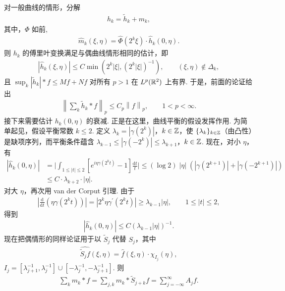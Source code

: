 对一般曲线的情形，分解
\begin{align*}
  h_{k}=\widetilde{h}_{k}+m_{k},
\end{align*}
其中，$\Phi$ 如前,
\begin{align*}
  \widehat{m}_{k}(\xi,\eta)=\widehat{\Phi}(2^{k}\xi)\cdot\widehat{h}_{k}(0,\eta).
\end{align*}
则 $h_{k}$ 的傅里叶变换满足与偶曲线情形相同的估计，即
\begin{align*}
  |\widehat{h}_{k}(\xi,\eta)|\leq C\min(2^{k}|\xi|,(2^{k}|\xi|)^{-1}),\qquad (\xi,\eta)\notin\Delta_{k},
\end{align*}
且 $\sup_k |\widetilde{h}_k| * f \leq M f + N f$ 对所有 $p > 1$ 在 $L^p(\mathbb{R}^2)$ 上有界. 于是，前面的论证给出
\begin{align*}
  \left\|\sum_{k}\widetilde{h}_{k}*f\right\|_{p}\leq C_{p}\left\|f\right\|_{p},\qquad 1<p<\infty.
\end{align*}
接下来需要估计 $h_k(0, \eta)$ 的衰减. 正是在这里，曲线平衡的假设发挥作用. 为简单起见，假设平衡常数 $k \leq 2$. 定义 $\lambda_k = |\gamma(2^k)|$，$k \in \mathbb{Z}$，使 $\{\lambda_k\}_{k \in \mathbb{Z}}$（由凸性）是缺项序列，而平衡条件蕴含 $\lambda_{k-1} \leq |\gamma(-2^k)| \leq \lambda_{k+1}$，$k \in \mathbb{Z}$. 现在，对小 $\eta$，有
\begin{align*}
  |\widehat{h}_{k}(0,\eta)|
  &=\Big|\int_{1\leq|t|\leq 2}[e^{i\eta\gamma(2^{k} t)}-1]\frac{\mathrm{d}t}{t}\Big|
  \leq(\log 2)\;|\eta|\;(\left|\gamma(2^{k+1})\right|+\left|\gamma(-2^{k+1})\right|)\\
  &\leq C\cdot\lambda_{k+2}\cdot|\eta|.
\end{align*}
对大 $\eta$，再次用 van der Corput 引理. 由于
\begin{align*}
  \left|\frac{\mathrm{d}}{\mathrm{d}t}(\eta\gamma(2^{k} t))\right|
  =|2^{k}\eta\gamma^{\prime}(2^{k} t)|\geq\lambda_{k-1}|\eta|,\qquad 1\leq|t|\leq 2,
\end{align*}
得到
\begin{align*}
  |\widehat{h}_{k}(0,\eta)|\leq C\left(\lambda_{k-1}|\eta|\right)^{-1}.
\end{align*}
现在把偶情形的同样论证用于以 $\tilde{S}_{j}$ 代替 $S_{j}$，其中
\begin{align*}
  \widehat{\widetilde{S}_{j}f}(\xi,\eta)=\widehat{f}(\xi,\eta)\cdot\chi_{I_{j}}(\eta),
\end{align*}
$I_{j}=[\lambda_{j+1}^{-1},\lambda_{j}^{-1}]\cup[-\lambda_{j}^{-1},-\lambda_{j+1}^{-1}]$. 则
\begin{align*}
  \sum_{k}m_{k}*f=\sum_{j,k}m_{k}*\tilde{S}_{j+k}f=\sum_{j=-\infty}^{\infty}A_{j}f.
\end{align*}
